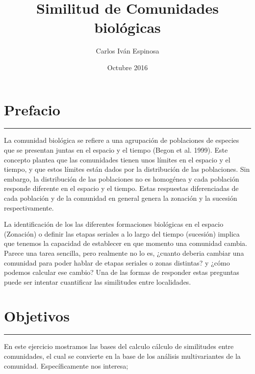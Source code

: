 \documentclass[]{book}
\title{Similitud de Comunidades biológicas}
\author{Carlos Iván Espinosa}
\date{Octubre 2016}
\begin{document}
\maketitle

{
\setcounter{tocdepth}{1}
\tableofcontents
}
\chapter*{Prefacio}\label{prefacio}

\begin{center}\rule{0.5\linewidth}{\linethickness}\end{center}

La comunidad biológica se refiere a una agrupación de poblaciones de
especies que se presentan juntas en el espacio y el tiempo (Begon et al.
1999). Este concepto plantea que las comunidades tienen unos límites en
el espacio y el tiempo, y que estos límites están dados por la
distribución de las poblaciones. Sin embargo, la distribución de las
poblaciones no es homogénea y cada población responde diferente en el
espacio y el tiempo. Estas respuestas diferenciadas de cada población y
de la comunidad en general genera la zonación y la sucesión
respectivamente.

La identificación de los las diferentes formaciones biológicas en el
espacio (Zonación) o definir las etapas seriales a lo largo del tiempo
(sucesión) implica que tenemos la capacidad de establecer en que momento
una comunidad cambia. Parece una tarea sencilla, pero realmente no lo
es, ¿cuanto deberia cambiar una comunidad para poder hablar de etapas
seriales o zonas distintas? y ¿cómo podemos calcular ese cambio? Una de
las formas de responder estas preguntas puede ser intentar cuantificar
las similitudes entre localidades.

\chapter*{Objetivos}\label{objetivos}

\begin{center}\rule{0.5\linewidth}{\linethickness}\end{center}

En este ejercicio mostramos las bases del calculo cálculo de similitudes
entre comunidades, el cual se convierte en la base de los análisis
multivariantes de la comunidad. Específicamente nos interesa;
\end{document}
